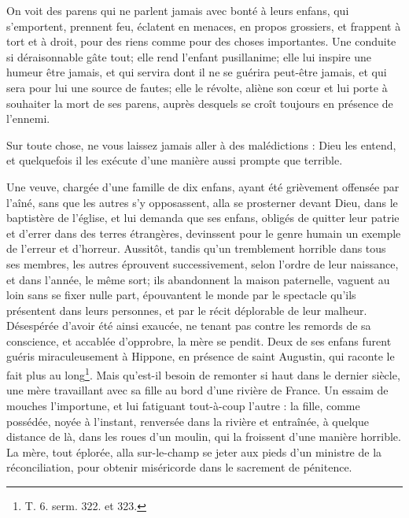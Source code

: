 \documentclass[instructions.tex]{subfiles}
\begin{document}
On voit des parens qui ne parlent jamais avec bonté à leurs enfans, qui s’emportent, prennent feu, éclatent en menaces, en propos grossiers, et frappent à tort et à droit, pour des riens comme pour des choses importantes. Une conduite si déraisonnable gâte tout; elle rend l’enfant pusillanime; elle lui inspire une humeur être jamais, et qui servira dont il ne se guérira peut-être jamais, et qui sera pour lui une source de fautes; elle le révolte, aliène son cœur et lui porte à souhaiter la mort de ses parens, auprès desquels se croît toujours en présence de l’ennemi.
 
Sur toute chose, ne vous laissez jamais aller à des malédictions : Dieu les entend, et quelquefois il les exécute d’une manière aussi prompte que terrible.
 
Une veuve, chargée d’une famille de dix enfans, ayant été grièvement offensée par l’aîné, sans que les autres s’y opposassent, alla se prosterner devant Dieu, dans le baptistère de l’église, et lui demanda que ses enfans, obligés de quitter leur patrie et d’errer dans des terres étrangères, devinssent pour le genre humain un exemple de l’erreur et d’horreur. Aussitôt, tandis qu’un tremblement horrible dans tous ses membres, les autres éprouvent successivement, selon l’ordre de leur naissance, et dans l’année, le même sort; ils abandonnent la maison paternelle, vaguent au loin sans se fixer nulle part, épouvantent le monde par le spectacle qu’ils présentent dans leurs personnes, et par le récit déplorable de leur malheur. Désespérée d’avoir été ainsi exaucée, ne tenant pas contre les remords de sa conscience, et accablée d’opprobre, la mère se pendit. Deux de ses enfans furent guéris miraculeusement à Hippone, en présence de saint Augustin, qui raconte le fait plus au long\footnote{T. 6. serm. 322. et 323.}. Mais qu’est-il besoin de remonter si haut dans le dernier siècle, une mère travaillant avec sa fille au bord d’une rivière de France. Un essaim de mouches l’importune, et lui fatiguant tout-à-coup l’autre : la fille, comme possédée, noyée à l’instant, renversée dans la rivière et entraînée, à quelque distance de là, dans les roues d’un moulin, qui la froissent d’une manière horrible. La mère, tout éplorée, alla sur-le-champ se jeter aux pieds d’un ministre de la réconciliation, pour obtenir miséricorde dans le sacrement de pénitence.
 
\end{document}
